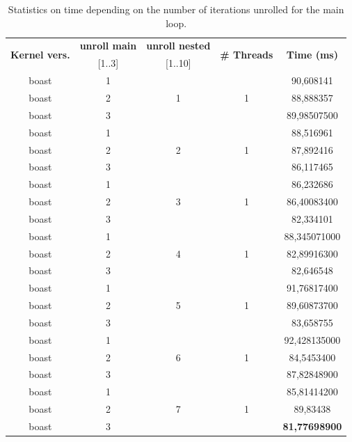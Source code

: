 \documentclass[10pt,twoside]{article}   	%
\begin{document}
\begin{table}[ht!]
\centering
\caption{Statistics on time depending on the number of iterations unrolled for the main loop.}
{\scriptsize
\begin{tabular}{|c|c|c|c|c|} \hline 
\multirow{2}{*}{ {{\bf{Kernel vers.}}} }	 &   {{\bf{unroll main}}}   & {{\bf{unroll nested}}}   &    \multirow{2}{*}{ {{\bf{\# Threads}}} }  &  \multirow{2}{*}{ {{\bf{Time (ms)}}} }  \\ 
							 &    	[1..3]		 	    &   [1..10]	 		 & 							      &  				\\ \hline \hline
boast &    1 &  &  & 90,608141 \\ \cline{1-2}  \cline{5-5}
boast &    2 & 1 & 1 & 88,888357 \\  \cline{1-2}  \cline{5-5}
boast &    3 &  & & 89,98507500 \\ \hline \hline

boast &   1 &  &  & 88,516961 \\ \cline{1-2}  \cline{5-5}
boast &    2 & 2 & 1 & 87,892416 \\ \cline{1-2}  \cline{5-5}
boast &    3 &  &  & 86,117465 \\ \hline \hline

boast &    1 &  &  & 86,232686 \\ \cline{1-2}  \cline{5-5}
boast &    2 & 3 & 1 & 86,40083400 \\ \cline{1-2}  \cline{5-5}
boast &   3 &  &  & 82,334101 \\ \hline \hline

boast &    1 &  &  & 88,345071000 \\ \cline{1-2}  \cline{5-5}
boast &    2 & 4 & 1 & 82,89916300 \\ \cline{1-2}  \cline{5-5}
boast &    3 &  &  & 82,646548 \\ \hline \hline

boast &    1 & &  & 91,76817400 \\ \cline{1-2}  \cline{5-5}
boast &    2 & 5 & 1 & 89,60873700 \\ \cline{1-2}  \cline{5-5}
boast &   3 &  &  & 83,658755 \\ \hline \hline

boast &   1 & &  & 92,428135000 \\ \cline{1-2}  \cline{5-5}
boast &    2 & 6 & 1 & 84,5453400 \\ \cline{1-2}  \cline{5-5}
boast &  3 &  &  & 87,82848900 \\ \hline \hline

boast &    1 &  &  & 85,81414200 \\ \cline{1-2}  \cline{5-5}
boast &    2 & 7 & 1 & 89,83438 \\ \cline{1-2}  \cline{5-5}
boast &   3 &  & & {\bf{81,77698900}}  \\ \hline \hline


\end{tabular}}
\end{table}
\end{document}
